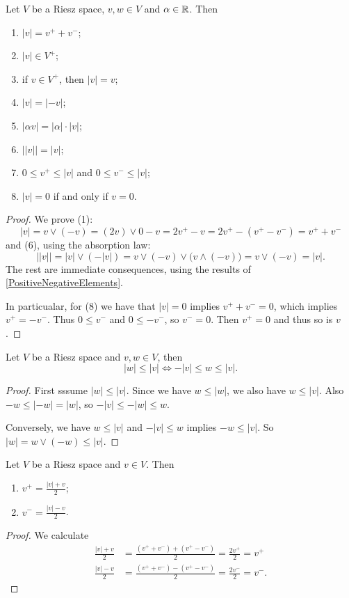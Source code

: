 \begin{lemma} \label{absoluteValue}
Let $V$ be a Riesz space, $v,w\in V$ and $\alpha\in \mathbb{R}$. Then
\begin{enumerate}
\item $|v| = v^+ + v^-$;
\item $|v| \in V^+$;
\item if $v\in V^+$, then $|v| = v$;
\item $|v| = |-v|$;
\item $|\alpha v| = |\alpha|\cdot |v|$;
\item $\big||v|\big| = |v|$;
\item $0 \leq v^+ \leq |v|$ and $0 \leq v^- \leq |v|$;
\item $|v| = 0$ \textup{if and only if} $v = 0$.
\end{enumerate}
\end{lemma}
\begin{proof}
We prove (1):
\[ |v| = v\vee (-v) = (2v)\vee 0 - v = 2v^+ - v = 2v^+ - (v^+ - v^-) = v^+ + v^- \]
and (6), using the absorption law:
\[ \big||v|\big| = |v|\vee (-|v|) = v \vee (-v) \vee \big( v\wedge (-v) \big) = v \vee (-v) = |v|. \]
The rest are immediate consequences, using the results of \ref{PositiveNegativeElements}.

In particualar, for (8) we have that $|v|=0$ implies $v^+ + v^- = 0$, which implies $v^+ = -v^-$. Thus $0\leq v^-$ and $0\leq -v^-$, so $v^- = 0$. Then $v^+ = 0$ and thus so is $v$.
\end{proof}

\begin{lemma} \label{solidLemma}
Let $V$ be a Riesz space and $v,w\in V$, then
\[ |w|\leq |v| \iff -|v| \leq w \leq |v|. \]
\end{lemma}
\begin{proof}
First sssume $|w| \leq |v|$. Since we have $w \leq |w|$, we also have $w\leq |v|$. Also $-w \leq |-w| = |w|$, so $-|v| \leq -|w| \leq w$.

Conversely, we have $w\leq |v|$ and $-|v| \leq w$ implies $-w\leq |v|$. So $|w| = w\vee (-w) \leq |v|$.
\end{proof}

\begin{lemma} \label{positiveNegativePartAverage}
Let $V$ be a Riesz space and $v\in V$. Then
\begin{enumerate}
\item $\displaystyle v^+ = \frac{|v|+v}{2}$;
\item $\displaystyle v^- = \frac{|v|-v}{2}$.
\end{enumerate}
\end{lemma}
\begin{proof}
We calculate
\begin{align*}
\frac{|v|+v}{2} &= \frac{(v^+ + v^-) + (v^+ - v^-)}{2} = \frac{2v^+}{2} = v^+ \\
\frac{|v|-v}{2} &= \frac{(v^+ + v^-) - (v^+ - v^-)}{2} = \frac{2v^-}{2} = v^-.
\end{align*}
\end{proof}

